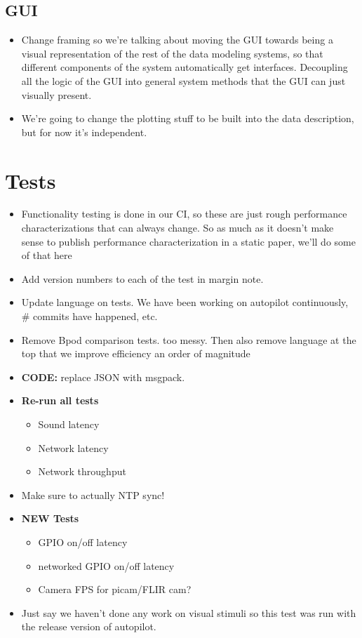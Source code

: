 \subsection{GUI}

\begin{itemize}
\item Change framing so we're talking about moving the GUI towards being a visual representation of the rest of the data modeling systems, so that different components of the system automatically get interfaces. Decoupling all the logic of the GUI into general system methods that the GUI can just visually present.
\item We're going to change the plotting stuff to be built into the data description, but for now it's independent.
\end{itemize}

\section{Tests}

\begin{itemize}
\item Functionality testing is done in our CI, so these are just rough performance characterizations that can always change. So as much as it doesn't make sense to publish performance characterization in a static paper, we'll do some of that here
\item Add version numbers to each of the test in margin note.
\item Update language on tests. We have been working on autopilot continuously, \# commits have happened, etc.
\item Remove Bpod comparison tests. too messy. Then also remove language at the top that we improve efficiency an order of magnitude
\item \textbf{CODE:} replace JSON with msgpack.
\item \textbf{Re-run all tests} 
\begin{itemize}
\item Sound latency
\item Network latency
\item Network throughput
\end{itemize}
\item Make sure to actually NTP sync!
\item \textbf{NEW Tests}
\begin{itemize}
\item GPIO on/off latency
\item networked GPIO on/off latency
\item Camera FPS for picam/FLIR cam?
\end{itemize}
\item Just say we haven't done any work on visual stimuli so this test was run with the release version of autopilot.

\end{itemize}



